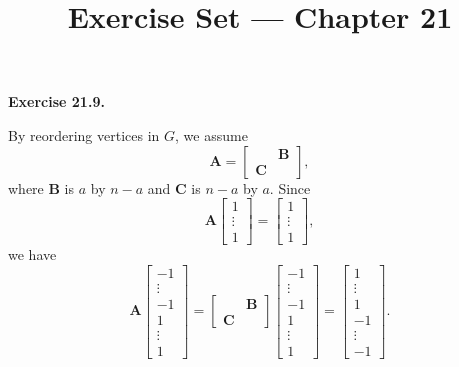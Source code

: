 \documentclass[a4paper]{article}
\title{Exercise Set --- Chapter 21}
\date{}
\newenvironment{exercise}[1]{
	\par
	\noindent\textbf{Exercise #1.}\quad
}{
	\par
	\bigskip
}
\begin{document}
    \maketitle

    \begin{exercise}{21.9}
        By reordering vertices in $G$, we assume 
        $$
        \bm A=\begin{bmatrix}
            &\bm B\\
            \bm C & 
        \end{bmatrix},
        $$
        where $\bm B$ is $a$ by $n-a$ and $\bm C$ is $n-a$ by $a$.
        Since 
        $$
        \bm A\begin{bmatrix}1\\\vdots\\1\end{bmatrix}=\begin{bmatrix}1\\\vdots\\1\end{bmatrix},
        $$
        we have
        $$
        \bm A\begin{bmatrix}-1\\\vdots\\-1\\1\\\vdots\\1\end{bmatrix}
        =\begin{bmatrix}&\bm B\\\bm C &\end{bmatrix}\begin{bmatrix}-1\\\vdots\\-1\\1\\\vdots\\1\end{bmatrix}
        =\begin{bmatrix}1\\\vdots\\1\\-1\\\vdots\\-1\end{bmatrix}.
        $$
    \end{exercise}
\end{document}
